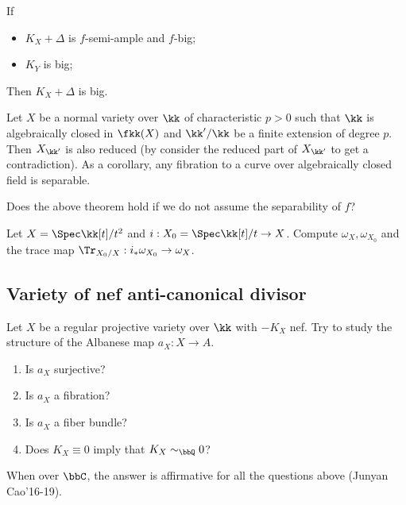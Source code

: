 \begin{corollary}
	If
	\begin{itemize}
		\item $K_X + \Delta$ is $f$-semi-ample and $f$-big;
		\item $K_Y$ is big;
	\end{itemize}
	Then $K_X + \Delta$ is big.
\end{corollary}

\begin{remark}
	Let $X$ be a normal variety over $\kk$ of characteristic $p > 0$ such that $\kk$ is algebraically closed in $\fkk(X)$ and $\kk'/ \kk$ be a finite extension of degree $p$.
	Then $X_{\kk'}$ is also reduced (by consider the reduced part of $X_{\kk'}$ to get a contradiction).
	As a corollary, any fibration to a curve over algebraically closed field is separable.
\end{remark}

\begin{question}
	Does the above theorem hold if we do not assume the separability of $f$?
\end{question}

\begin{exercise}
	Let $X = \Spec \kk[t]/ t^2$ and $i: X_0 = \Spec \kk[t] / t \to X$.
	Compute $\omega_X, \omega_{X_0}$ and the trace map $\Tr_{X_0/X}: i_* \omega_{X_0} \to \omega_X$.
\end{exercise}


\subsection{Variety of nef anti-canonical divisor}

\begin{question}\label{q:positivity4-anti-canonical}
	Let $X$ be a regular projective variety over $\kk$ with $-K_X$ nef.
	Try to study the structure of the Albanese map $a_X: X \to A$.
	\begin{enumerate}
		\item Is $a_X$ surjective?
		\item Is $a_X$ a fibration?
		\item Is $a_X$ a fiber bundle?
		\item Does $K_X \equiv 0$ imply that $K_X \sim_{\bbQ} 0$?
	\end{enumerate}
\end{question}

When over $\bbC$, the answer is affirmative for all the questions above (Junyan Cao'16-19).

